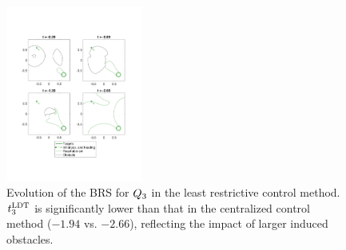 \begin{figure}[H]
  \vspace{-1em}
  \centering
  \includegraphics[width=0.40\textwidth]{"fig/lrc_rs3"}
  \caption{Evolution of the BRS for $Q_3$ in the least restrictive control method. $t^\text{LDT}_3$ is significantly lower than that in the centralized control method ($-1.94$ vs. $-2.66$), reflecting the impact of larger induced obstacles.}
  \label{fig:lrc_rs3}
  \vspace{-1.5em}
\end{figure}
